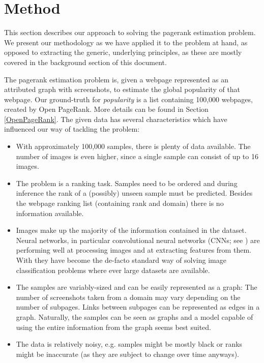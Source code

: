 \section{Method}

This section describes our approach to solving the pagerank estimation problem. We present our methodology as we have applied it to the problem at hand, as opposed to extracting the generic, underlying principles, as these are mostly covered in the background section of this document.

The pagerank estimation problem is, given a webpage represented as an attributed graph with screenshots, to estimate the global popularity of that webpage.
Our ground-truth for \textit{popularity} is a list containing 100,000 webpages, created by Open PageRank.
More details can be found in Section \ref{OpenPageRank}.
The given data has several characteristics which have influenced our way of tackling the problem:

\begin{itemize}
    \item With approximately 100,000 samples, there is plenty of data available. The number of images is even higher, since a single sample can consist of up to 16 images.
    \item The problem is a ranking task. Samples need to be ordered and during inference the rank of a (possibly) unseen sample must be predicted. Besides the webpage ranking list (containing rank and domain) there is no information available.
    \item Images make up the majority of the information contained in the dataset. Neural networks, in particular convolutional neural networks (CNNs; see \cite{lecun1989backpropagation}) are performing well at processing images and at extracting features from them. With \cite{krizhevsky:imagenet} they have become the de-facto standard way of solving image classification problems where ever large datasets are available.
    \item The samples are variably-sized and can be easily represented as a graph: The number of screenshots taken from a domain may vary depending on the number of subpages. Links between subpages can be represented as edges in a graph. Naturally, the samples can be seen as graphs and a model capable of using the entire information from the graph seems best suited.
    \item The data is relatively noisy, e.g. samples might be mostly black or ranks might be inaccurate (as they are subject to change over time anyways).
\end{itemize}

